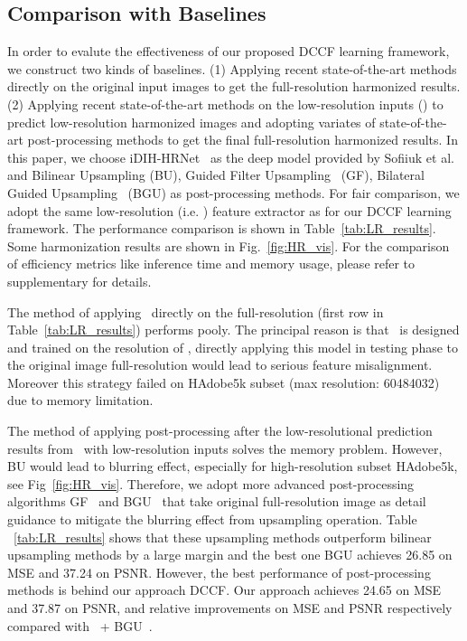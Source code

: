 \documentclass[runningheads]{llncs}
\begin{document}
    \subsection{Comparison with Baselines}
    In order to evalute the effectiveness of our proposed DCCF learning framework, we construct two kinds of baselines. (1) Applying recent state-of-the-art methods directly on the original input images to get the full-resolution harmonized results.
    (2) Applying recent state-of-the-art methods on the low-resolution inputs () to predict low-resolution harmonized images  and adopting variates of state-of-the-art post-processing methods to get the final full-resolution harmonized results.
    In this paper, we choose iDIH-HRNet~\cite{sofiiuk2021foreground} as the deep model provided by Sofiiuk et al.~\cite{sofiiuk2021foreground} and Bilinear Upsampling (BU), Guided Filter Upsampling~\cite{hekaiming2013GF} (GF), Bilateral Guided Upsampling~\cite{chen2016bilateral} (BGU) as post-processing methods.
    For fair comparison, we adopt the same low-resolution (i.e. ) feature extractor as \cite{sofiiuk2021foreground} for our DCCF learning framework.
    The performance comparison is shown in Table~\ref{tab:LR_results}. Some harmonization results are shown in Fig.~\ref{fig:HR_vis}. For the comparison of efficiency metrics like inference time and memory usage, please refer to supplementary for details.
    

    The method of applying~\cite{sofiiuk2021foreground} directly on the full-resolution (first row in Table~\ref{tab:LR_results}) performs pooly.
    The principal reason is that~\cite{sofiiuk2021foreground} is designed and trained on the resolution of , directly applying this model in testing phase to the original image full-resolution would lead to serious feature misalignment.
    Moreover this strategy failed on HAdobe5k subset (max resolution: 60484032) due to memory limitation.

    The method of applying post-processing after the low-resolutional prediction results from~\cite{sofiiuk2021foreground} with low-resolution inputs solves the memory problem.
However, BU would lead to blurring effect, especially for high-resolution subset HAdobe5k, see Fig~\ref{fig:HR_vis}.
    Therefore, we adopt more advanced post-processing algorithms GF~\cite{hekaiming2013GF} and BGU~\cite{chen2016bilateral} that take original full-resolution image as detail guidance to mitigate the blurring effect from upsampling operation.
    Table ~\ref{tab:LR_results} shows that these upsampling methods outperform bilinear upsampling methods by a large margin and the best one BGU\cite{chen2016bilateral} achieves 26.85 on MSE and 37.24 on PSNR.
    However, the best performance of post-processing methods is behind our approach DCCF.
    Our approach achieves 24.65 on MSE and 37.87 on PSNR,  and  relative improvements on MSE and PSNR respectively compared with ~\cite{sofiiuk2021foreground}+ BGU~\cite{chen2016bilateral}.
\end{document}
